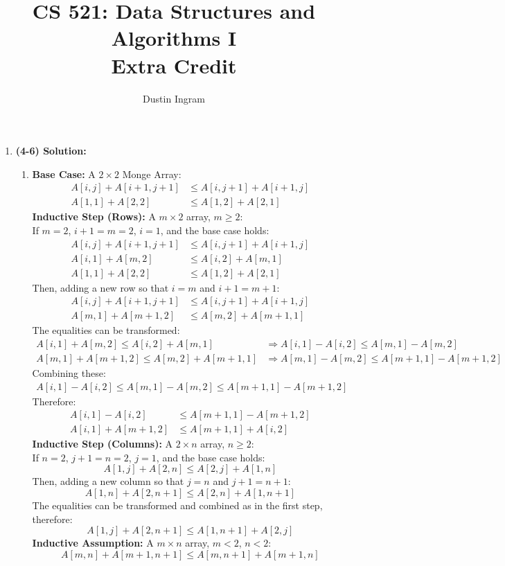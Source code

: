 \documentclass{article}
\title{CS 521: Data Structures and Algorithms I \\ Extra Credit}
\author{Dustin Ingram}
\begin{document}
\maketitle
\begin{enumerate}
    \item \textbf{(4-6) Solution:} 
    \begin{enumerate}
        \item \textbf{Base Case:} A $2\times 2$ Monge Array:
        \begin{align*}
            A[i,j] + A[i+1,j+1] &\leq A[i,j+1]+A[i+1,j] \\
            A[1,1] + A[2,2] &\leq A[1,2]+A[2,1]
        \end{align*}
        \textbf{Inductive Step (Rows):} A $m\times 2$ array, $m\geq2$:\\
        If $m=2$, $i+1=m=2$, $i=1$, and the base case holds:
        \begin{align*}
            A[i,j] + A[i+1,j+1] &\leq A[i,j+1]+A[i+1,j] \\
            A[i,1] + A[m,2] &\leq A[i,2]+A[m,1] \\
            A[1,1] + A[2,2] &\leq A[1,2]+A[2,1]
        \end{align*}
        Then, adding a new row so that $i=m$ and $i+1=m+1$:
        \begin{align*}
            A[i,j] + A[i+1,j+1] &\leq A[i,j+1]+A[i+1,j] \\
            A[m,1] + A[m+1,2] &\leq A[m,2]+A[m+1,1]
        \end{align*}
        The equalities can be transformed:
        \begin{align*}
            A[i,1] + A[m,2] \leq A[i,2]+A[m,1] &\Rightarrow A[i,1] - A[i,2] \leq A[m,1] - A[m,2] \\
            A[m,1] + A[m+1,2] \leq A[m,2]+A[m+1,1] &\Rightarrow A[m,1] - A[m,2] \leq A[m+1, 1] - A[m+1,2]
        \end{align*}
        Combining these:
        \begin{align*}
            A[i,1] - A[i,2] \leq A[m,1] - A[m,2] \leq A[m+1, 1] - A[m+1,2]
        \end{align*}
        Therefore:
        \begin{align*}
            A[i,1] - A[i,2] &\leq A[m+1, 1] - A[m+1,2] \\
            A[i,1] + A[m+1,2] &\leq A[m+1, 1] + A[i,2]
        \end{align*}
        \textbf{Inductive Step (Columns):} A $2\times n$ array, $n\geq2$:\\
        If $n=2$, $j+1=n=2$, $j=1$, and the base case holds:
            $$A[1,j] + A[2,n] \leq A[2,j]+A[1,n]$$
        Then, adding a new column so that $j=n$ and $j+1=n+1$:
            $$A[1,n] + A[2,n+1] \leq A[2,n]+A[1,n+1]$$
        The equalities can be transformed and combined as in the first step, therefore:
            $$A[1,j] + A[2,n+1] \leq A[1, n+1] + A[2,j]$$
        \textbf{Inductive Assumption:} A $m\times n$ array, $m<2$, $n<2$:
            $$A[m,n] + A[m+1, n+1] \leq A[m, n+1] + A[m+1, n]$$


\end{enumerate}
\end{enumerate}
\end{document}
